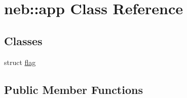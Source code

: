 \hypertarget{classneb_1_1app}{\section{neb\-:\-:app \-Class \-Reference}
\label{classneb_1_1app}
}
\subsection*{\-Classes}
\begin{DoxyCompactItemize}
\item 
struct \hyperlink{structneb_1_1app_1_1flag}{flag}
\end{DoxyCompactItemize}
\subsection*{\-Public \-Member \-Functions}
